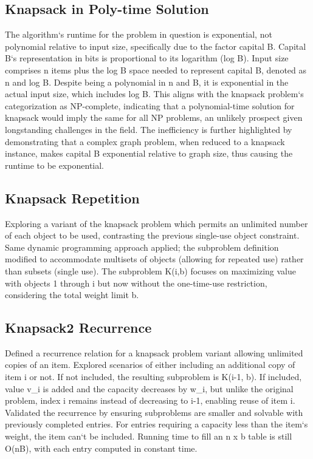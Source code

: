 \subsection*{Knapsack in Poly-time Solution}
The algorithm`s runtime for the problem in question is exponential, not polynomial relative to input size, specifically due to the factor capital B\@.
Capital B`s representation in bits is proportional to its logarithm (log B).
Input size comprises n items plus the log B space needed to represent capital B, denoted as n and log B\@.
Despite being a polynomial in n and B, it is exponential in the actual input size, which includes log B\@.
This aligns with the knapsack problem`s categorization as NP-complete, indicating that a polynomial-time solution for knapsack would imply the same for all NP problems, an unlikely prospect given longstanding challenges in the field.
The inefficiency is further highlighted by demonstrating that a complex graph problem, when reduced to a knapsack instance, makes capital B exponential relative to graph size, thus causing the runtime to be exponential.

\subsection*{Knapsack Repetition}
Exploring a variant of the knapsack problem which permits an unlimited number of each object to be used, contrasting the previous single-use object constraint.
Same dynamic programming approach applied; the subproblem definition modified to accommodate multisets of objects (allowing for repeated use) rather than subsets (single use).
The subproblem K(i,b) focuses on maximizing value with objects 1 through i but now without the one-time-use restriction, considering the total weight limit b.

\subsection*{Knapsack2  Recurrence}
Defined a recurrence relation for a knapsack problem variant allowing unlimited copies of an item.
Explored scenarios of either including an additional copy of item i or not.
If not included, the resulting subproblem is K(i-1, b).
If included, value v\_i is added and the capacity decreases by w\_i, but unlike the original problem, index i remains instead of decreasing to i-1, enabling reuse of item i.
Validated the recurrence by ensuring subproblems are smaller and solvable with previously completed entries.
For entries requiring a capacity less than the item`s weight, the item can`t be included.
Running time to fill an n x b table is still O(nB), with each entry computed in constant time.

